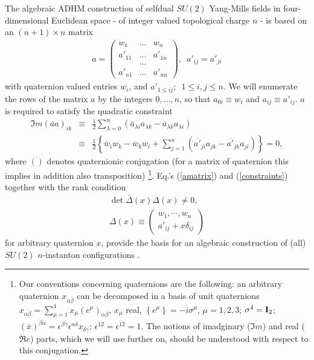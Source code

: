 \documentclass[a4paper,12pt]{article}
\begin{document}
The algebraic ADHM construction of selfdual $SU(2)$ Yang-Mills 
fields in four-dimensional Euclidean space - of integer valued 
topological charge $n$ - is based on an $(n+1)\times n$ matrix 
\begin{eqnarray}
a=\left( \begin{array}{ccc}
w_1 & \ldots & w_n \\
a'_{11} & \ldots & a'_{1n} \\
 & \ldots &  \\
a'_{n1} & \ldots & a'_{nn}
\end{array}\right) , \, \, \, a'_{ij}=a'_{ji}
\label{amatrix}
\end{eqnarray}
with quaternion valued entries $w_i$, and $a'_{1 \leq ij}; \,$ $1 \leq 
i,j \leq n$. 
We will enumerate the rows of the matrix $a$ by the integers 
$0, \ldots , n$, so that $a_{0i}\equiv w_i$ and $a_{ij}\equiv a'_{ij}$. 
$a$ is required to satisfy the quadratic constraint
\begin{eqnarray}
\Im m (\overline{a} a)_{ik}&\equiv& \frac{1}{2} \sum_{\lambda =0}^n
\left(\overline{a}_{\lambda i} a_{\lambda k} - 
\overline{a}_{\lambda k} a_{\lambda i} \right) \nonumber \\
&\equiv& \frac{1}{2} \left\{\overline{w}_i w_k  - \overline{w}_k w_i + 
\sum_{j=1}^n \left(\overline{a'}_{ji}a_{jk} - 
\overline{a'}_{jk} a_{ji} \right) \right\} =0, 
\label{constraints}
\end{eqnarray}
where $\overline{()}$ denotes quaternionic conjugation (for a matrix 
of quaternion this implies in addition also transposition)
\footnote{Our conventions concerning quaternions are the following: 
an arbitrary quaternion $x_{\alpha \dot{\beta}}$ can be 
decomposed in a basis of unit quaternions $x_{\alpha \dot{\beta}}= 
\sum_{\mu =1}^4 x_{\mu}\left(e^{\mu}\right)_{\alpha \dot{\beta}}$, 
$x_{\mu}$ real, $\left\{e^{\mu}\right\}=-i \sigma^{\mu}$, $\mu =
1,2,3$; $\sigma^4={\bf I}_2$; $\left(\bar{x}\right)^{\dot{\beta}\alpha}
=\epsilon^{\dot{\beta}\dot{\gamma}}\epsilon^{\alpha \delta}x_{\delta 
\dot{\gamma}}$; $\epsilon^{12}=\epsilon^{\dot{1}\dot{2}}=1$. 
The notions of imadginary ($\Im m$) and real ($\Re e$) parts, which 
we will use further on, should be understood with respect to this 
conjugation.}. 
Eq.'s (\ref{amatrix}) and (\ref{constraints}) together with the 
rank condition 
\begin{eqnarray}
\label{rankcondition}
\det \bar{\Delta} (x) \Delta (x) \ne 0, \\
\Delta (x) \equiv 
\left(
\begin{array}{c}
w_1, \cdots, w_n \\
a'_{ij}+x\delta_{ij}
\end{array}
\right) \nonumber 
\end{eqnarray}
for arbitrary quaternion $x$, 
provide the basis for an algebraic construction of (all) $SU(2)$ 
$n$-instanton configurations \cite{adhm}.
\end{document}
